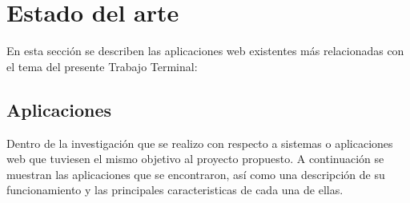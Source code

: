 \chapter{Estado del arte}


\noindent En esta sección se describen las aplicaciones web existentes más relacionadas con el tema del presente Trabajo Terminal:




\section{Aplicaciones}
\noindent Dentro de la investigación que se realizo con respecto a sistemas o aplicaciones web que tuviesen el mismo objetivo al proyecto propuesto. A continuación se muestran las aplicaciones que se encontraron, así como una descripción de su funcionamiento y las principales caracteristicas de cada una de ellas.
